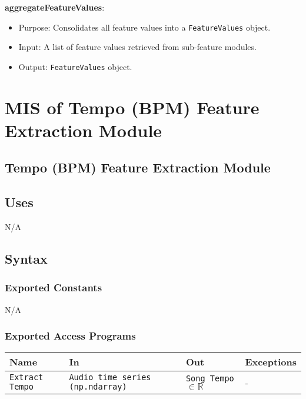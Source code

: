 \documentclass[12pt, titlepage]{article}
\begin{document}
\textbf{aggregateFeatureValues}:
\begin{itemize}
    \item Purpose: Consolidates all feature values into a \texttt{FeatureValues} object.
    \item Input: A list of feature values retrieved from sub-feature modules.
    \item Output: \texttt{FeatureValues} object.
\end{itemize}

\section{MIS of Tempo (BPM) Feature Extraction Module} 

\subsection{Tempo (BPM) Feature Extraction Module}

\subsection{Uses}
N/A

\subsection{Syntax}

\subsubsection{Exported Constants}
N/A

\subsubsection{Exported Access Programs}

\begin{center}
\begin{tabular}{p{2cm} p{4cm} p{4cm} p{2cm}}
\hline
\textbf{Name} & \textbf{In} & \textbf{Out} & \textbf{Exceptions}\\
\hline%
\texttt{Extract Tempo} &\texttt{Audio time series (np.ndarray)} &\texttt{Song Tempo} $\in \mathbb{R}$ &- \\
\hline
\end{tabular}
\end{center}
\end{document}
